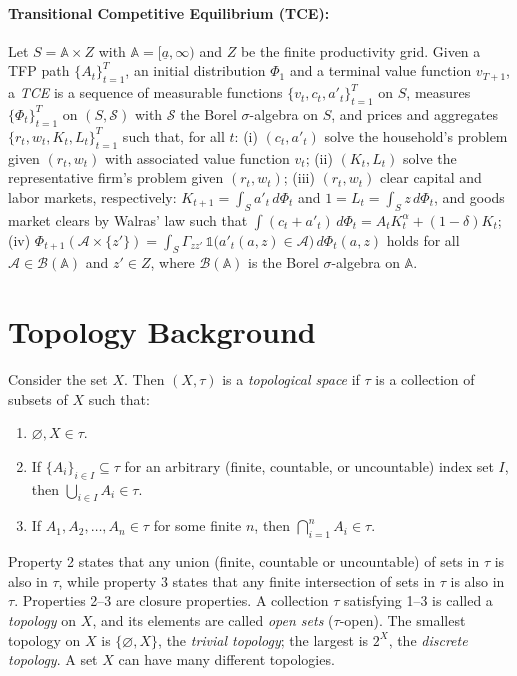 \documentclass[12pt]{article}
\theoremstyle{remark}
\begin{document}
\paragraph{Transitional Competitive Equilibrium (TCE):} 
Let $S=\mathbb{A}\times Z$ with $\mathbb{A}=[\underline{a},\infty)$ and $Z$ 
be the finite productivity grid. Given a TFP path $\{A_t\}_{t=1}^{T}$, an initial 
distribution $\Phi_1$ and a terminal value function $v_{T+1}$, a \emph{TCE} is a sequence 
of measurable functions $\{v_t,c_t,a'_t\}_{t=1}^{T}$ on $S$, measures $\{\Phi_t\}_{t=1}^{T}$ on 
$(S,\mathcal{S})$ with $\mathcal{S}$ the Borel $\sigma$-algebra on $S$, and prices and aggregates 
$\{r_t,w_t,K_t,L_t\}_{t=1}^{T}$ such that, for all $t$: 
(i) $(c_t,a'_t)$ solve the household's problem given $(r_t,w_t)$ with associated value
function $v_{t}$; 
(ii) $(K_t,L_t)$ solve the representative firm's problem given $(r_t,w_t)$;
(iii) $(r_t,w_t)$ clear capital and labor markets, respectively: 
$K_{t+1}=\int_S a'_t\,d\Phi_t$ and $1=L_t=\int_S z\,d\Phi_t$, and goods market clears by 
Walras' law such that $\int (c_t+a'_t) \,d\Phi_t = A_tK_t^\alpha + (1-\delta) K_t$;
(iv) $\Phi_{t+1}(\mathcal{A}\times\{z'\})=\int_S\Gamma_{zz'}\,\mathds{1}\bigl(a'_t(a,z)\in\mathcal{A}\bigr)\,d\Phi_t(a,z)$ holds for all 
$\mathcal{A}\in\mathcal{B}(\mathbb{A})$
and $z'\in Z$, where 
$\mathcal{B}(\mathbb{A})$ is the Borel $\sigma$-algebra on $\mathbb{A}$.

\section{Topology Background}
Consider the set $X$. Then $(X,\tau)$ is a \emph{topological space} if $\tau$ 
is a collection of subsets of $X$ such that:
\begin{enumerate}
    \item $\varnothing, X \in \tau$.
    \item If $\{A_i\}_{i\in I}\subseteq\tau$ for an arbitrary (finite, countable, or uncountable) 
        index set $I$, then $\bigcup_{i\in I} A_i \in \tau$. 
    \item If $A_1, A_2, \ldots, A_n \in \tau$ for some finite $n$, then 
        $\bigcap_{i=1}^{n} A_i \in \tau$.
\end{enumerate}
Property 2 states that any union (finite, countable or uncountable) of sets in $\tau$ is also 
in $\tau$, while property 3 states that any finite intersection of sets in $\tau$ is also in $\tau$.
Properties 2--3 are closure properties. A collection $\tau$ satisfying 1--3 is called a 
\emph{topology} on $X$, and its elements are called \emph{open sets} ($\tau$-open). 
The smallest topology on $X$ is $\{\varnothing, X\}$, the \emph{trivial topology}; the largest 
is $2^X$, the \emph{discrete topology}. A set $X$ can have many different topologies.
\end{document}
